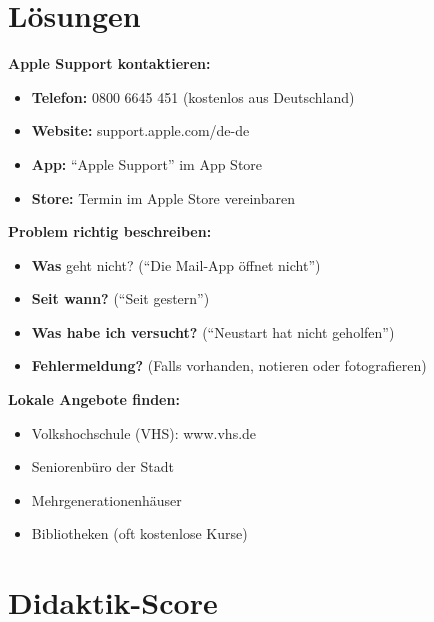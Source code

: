 \documentclass[11pt,a4paper]{article}
\begin{document}
\section{Lösungen}

\textbf{Apple Support kontaktieren:}
\begin{itemize}
    \item \textbf{Telefon:} 0800 6645 451 (kostenlos aus Deutschland)
    \item \textbf{Website:} support.apple.com/de-de
    \item \textbf{App:} ``Apple Support'' im App Store
    \item \textbf{Store:} Termin im Apple Store vereinbaren
\end{itemize}

\textbf{Problem richtig beschreiben:}
\begin{itemize}
    \item \textbf{Was} geht nicht? (``Die Mail-App öffnet nicht'')
    \item \textbf{Seit wann?} (``Seit gestern'')
    \item \textbf{Was habe ich versucht?} (``Neustart hat nicht geholfen'')
    \item \textbf{Fehlermeldung?} (Falls vorhanden, notieren oder fotografieren)
\end{itemize}

\textbf{Lokale Angebote finden:}
\begin{itemize}
    \item Volkshochschule (VHS): www.vhs.de
    \item Seniorenbüro der Stadt
    \item Mehrgenerationenhäuser
    \item Bibliotheken (oft kostenlose Kurse)
\end{itemize}

\section{Didaktik-Score}
\end{document}
